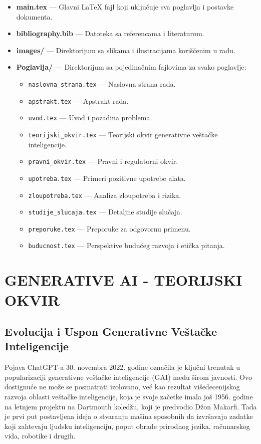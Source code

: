 \begin{itemize}
    \item \textbf{main.tex} — Glavni \LaTeX{} fajl koji uključuje sva poglavlja i postavke dokumenta.
    \item \textbf{bibliography.bib} — Datoteka sa referencama i literaturom.
    \item \textbf{images/} — Direktorijum sa slikama i ilustracijama korišćenim u radu.
    \item \textbf{Poglavlja/} — Direktorijum sa pojedinačnim fajlovima za svako poglavlje:
    \begin{itemize}
        \item \texttt{naslovna\_strana.tex} — Naslovna strana rada.
        \item \texttt{apstrakt.tex} — Apstrakt rada.
        \item \texttt{uvod.tex} — Uvod i pozadina problema.
        \item \texttt{teorijski\_okvir.tex} — Teorijski okvir generativne veštačke inteligencije.
        \item \texttt{pravni\_okvir.tex} — Pravni i regulatorni okvir.
        \item \texttt{upotreba.tex} — Primeri pozitivne upotrebe alata.
        \item \texttt{zloupotreba.tex} — Analiza zloupotreba i rizika.
        \item \texttt{studije\_slucaja.tex} — Detaljne studije slučaja.
        \item \texttt{preporuke.tex} — Preporuke za odgovornu primenu.
        \item \texttt{buducnost.tex} — Perspektive budućeg razvoja i etička pitanja.
    \end{itemize}
\end{itemize}

\section{GENERATIVE AI - TEORIJSKI OKVIR}

\subsection{Evolucija i Uspon Generativne Veštačke Inteligencije}
\justifying
Pojava ChatGPT-a 30. novembra 2022. godine označila je ključni trenutak u popularizaciji generativne veštačke inteligencije (GAI) među širom javnosti. Ovo dostignuće ne može se posmatrati izolovano, već kao rezultat višedecenijskog razvoja oblasti veštačke inteligencije, koja je svoje začetke imala još 1956. godine na letnjem projektu na Dartmouth koledžu, koji je predvodio Džon Makarfi. Tada je prvi put postavljena ideja o stvaranju mašina sposobnih da izvršavaju zadatke koji zahtevaju ljudsku inteligenciju, poput obrade prirodnog jezika, računarskog vida, robotike i drugih.

